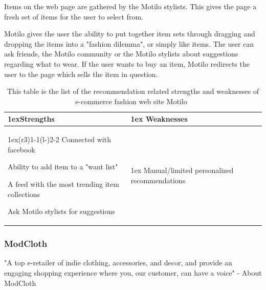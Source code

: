     Items on the web page are gathered by the Motilo stylists.
    This gives the page a fresh set of items for the user to select from.

    Motilo gives the user the ability to put together item sets through dragging and dropping the items into a "fashion dilemma", or simply like items.
    The user can ask friends, the Motilo community or the Motilo stylists about suggestions regarding what to wear.
    If the user wants to buy an item, Motilo redirects the user to the page which sells the item in question.

    \begin{table}[H]
    \centering
    \begin{tabularx}{\linewidth}{>{\parskip1ex}X@{\kern4\tabcolsep}>{\parskip1ex}X}
        \toprule
        \hfil\bfseries Strengths
        &
        \hfil\bfseries Weaknesses
            \\\cmidrule(r{3\tabcolsep}){1-1}\cmidrule(l{-\tabcolsep}){2-2}
            Connected with facebook \par
            Ability to add item to a "want list" \par
            A feed with the most trending item collections \par
            Ask Motilo stylists for suggestions \par
            &
            Manual/limited personalized recommendations \par
            \\\bottomrule
            \end{tabularx}
            \caption[Recommendation related strengths and weaknesses of Motilo~\cite{motilo}]{This table is the list of the recommendation related strengths and weaknesses of e-commerce fashion web site Motilo~\cite{motilo}}
            \label{table:ecommenreceMotilo}
        \end{table}


\subsubsection{ModCloth} %
\label{par:modcloth}
    "A top e-retailer of indie clothing, accessories, and decor, and provide an engaging shopping experience where you, our customer, can have a voice" - About ModCloth~\cite{modcloth}

